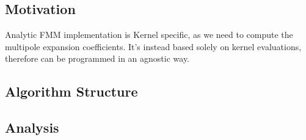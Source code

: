 

\subsection{Motivation}

Analytic FMM implementation is Kernel specific, as we need to compute the
multipole expansion coefficients. It's instead based solely on kernel evaluations,
therefore can be programmed in an agnostic way.

\subsection{Algorithm Structure}

\subsection{Analysis}